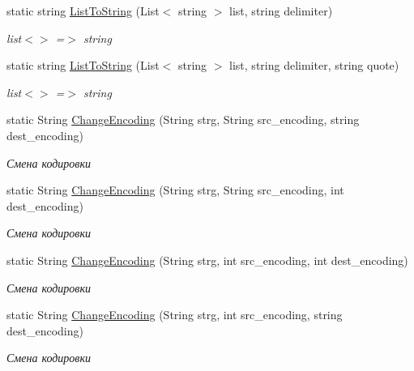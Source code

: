 \begin{DoxyCompactItemize}
\item 
static string \hyperlink{class_common_facilities_1_1_common_ad1cf9de3bb6a413a6021af56348c61cb}{ListToString} (List$<$ string $>$ list, string delimiter)
\begin{DoxyCompactList}\small\item\em list$<$$>$ =$>$ string \item\end{DoxyCompactList}\item 
static string \hyperlink{class_common_facilities_1_1_common_ab6fcbef16905a00432881079786a78bf}{ListToString} (List$<$ string $>$ list, string delimiter, string quote)
\begin{DoxyCompactList}\small\item\em list$<$$>$ =$>$ string \item\end{DoxyCompactList}\item 
static String \hyperlink{class_common_facilities_1_1_common_a17da98b3bd60d14b8b307af225e001a1}{ChangeEncoding} (String strg, String src\_\-encoding, string dest\_\-encoding)
\begin{DoxyCompactList}\small\item\em Смена кодировки \item\end{DoxyCompactList}\item 
static String \hyperlink{class_common_facilities_1_1_common_ad9aa0952e7edde5b2754db645d750864}{ChangeEncoding} (String strg, String src\_\-encoding, int dest\_\-encoding)
\begin{DoxyCompactList}\small\item\em Смена кодировки \item\end{DoxyCompactList}\item 
static String \hyperlink{class_common_facilities_1_1_common_a58a40261eccbb8d71a7d9a197b26a3c8}{ChangeEncoding} (String strg, int src\_\-encoding, int dest\_\-encoding)
\begin{DoxyCompactList}\small\item\em Смена кодировки \item\end{DoxyCompactList}\item 
static String \hyperlink{class_common_facilities_1_1_common_ac74544ee3d74e3472115ae40646eacdd}{ChangeEncoding} (String strg, int src\_\-encoding, string dest\_\-encoding)
\begin{DoxyCompactList}\small\item\em Смена кодировки \item\end{DoxyCompactList}\item 

\end{DoxyCompactItemize}
